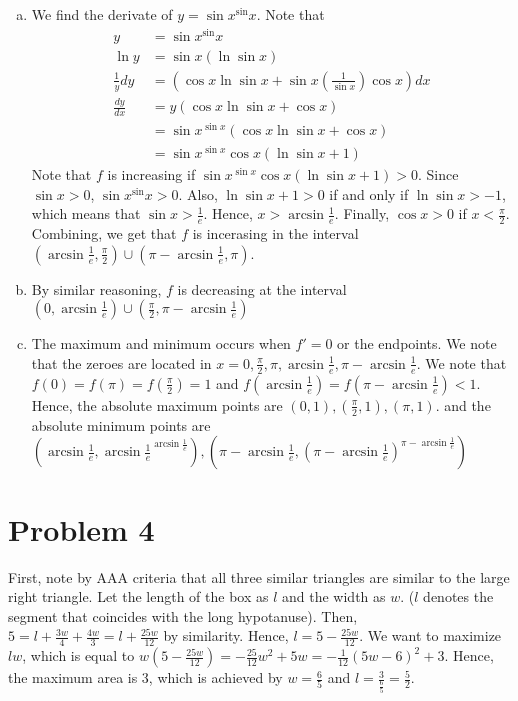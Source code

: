 \documentclass[12pt,a4paper]{article}
\begin{document}
\begin{enumerate}[a.]
    \item We find the derivate of $y = \sin{x}^\sin{x}$. Note that \begin{align*}
        y &= \sin{x}^\sin{x} \\
        \ln{y} &= \sin{x} (\ln{\sin{x}}) \\
        \frac{1}{y} dy &= (\cos{x} \ln{\sin{x}}+ \sin{x}\left( \frac{1}{\sin{x}} \right) \cos{x}) dx \\
        \frac{dy}{dx} &= y(\cos{x} \ln{\sin{x}}+\cos{x}) \\
        &= \sin{x}^{\sin{x}} (\cos{x} \ln{\sin{x}}+\cos{x}) \\ 
        &= \sin{x}^{\sin{x}} \cos{x} (\ln{\sin{x}}+1)
    \end{align*}
    Note that $f$ is increasing if $\sin{x}^{\sin{x}} \cos{x} (\ln{\sin{x}}+1) > 0$. Since $\sin{x} > 0$, $\sin{x}^\sin{x} >0$. Also, $\ln{\sin{x}}+1 >0$ if and only if $\ln{\sin{x}} > -1$, which means that $\sin{x} > \frac{1}{e}$. Hence, $x > \arcsin{\frac{1}{e}}$. Finally, $\cos{x} >0$ if $x < \frac{\pi}{2}$. Combining, we get that $f$ is incerasing in the interval $(\arcsin{\frac{1}{e}},\frac{\pi}{2}) \cup (\pi-\arcsin{\frac{1}{e}},\pi)$.
    \item By similar reasoning, $f$ is decreasing at the interval $(0,\arcsin{\frac{1}{e}}) \cup (\frac{\pi}{2},\pi-\arcsin{\frac{1}{e}})$
    \item The maximum and minimum occurs when $f' = 0$ or the endpoints. We note that the zeroes are located in $x=0,\frac{\pi}{2},\pi,\arcsin{\frac{1}{e}},\pi-\arcsin{\frac{1}{e}}$. We note that $f(0)=f(\pi)=f(\frac{\pi}{2}) = 1$ and $f(\arcsin{\frac{1}{e}}) = f(\pi - \arcsin{\frac{1}{e}}) < 1$. Hence, the absolute maximum points are $(0,1),(\frac{\pi}{2},1),(\pi,1)$. and the absolute minimum points are $\left( \arcsin{\frac{1}{e}}, {\arcsin{\frac{1}{e}}}^{\arcsin{\frac{1}{e}}} \right), \left( \pi-\arcsin{\frac{1}{e}}, { \left( \pi-\arcsin{\frac{1}{e}} \right) }^{\pi- \arcsin{\frac{1}{e}}} \right)$
    \end{enumerate}
    \section*{Problem 4} %
    First, note by AAA criteria that all three similar triangles are similar to the large right triangle. Let the length of the box as  $l$ and the width as $w$. ($l$ denotes the segment that coincides with the long hypotanuse). Then, $5 = l+\frac{3w}{4}+\frac{4w}{3} = l +\frac{25w}{12}$ by similarity. Hence, $l = 5-\frac{25w}{12}$. We want to maximize $lw$, which is equal to $w(5-\frac{25w}{12}) = -\frac{25}{12}w^2+5w = -\frac{1}{12}(5w-6)^2+3$. Hence, the maximum area is 3, which is achieved by $w = \frac{6}{5}$ and $l = \frac{3}{\frac{6}{5}} = \frac{5}{2}$.
    
\end{document}
